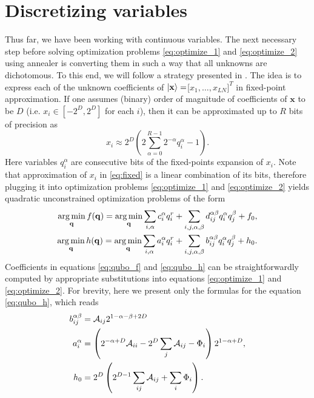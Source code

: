 \section{Discretizing variables}
Thus far, we have been working with continuous variables. The next necessary
step before solving optimization problems \eqref{eq:optimize_1} and
\eqref{eq:optimize_2} using annealer is converting them in such a way that all
unknowns are dichotomous. To this end, we will follow a strategy presented in
\cite{fixedpoint,chang}. The idea is to express each of the unknown
coefficients of $\ket{\mathbf{x}} = $[$x_1, \ldots, x_{LN}]^T$ in fixed-point
approximation. If one assumes (binary) order of magnitude of coefficients of
$\mathbf x$ to be $D$ (i.e. $x_i \in [-2^D, 2^D]$ for each $i$), then it can be
approximated up to $R$ bits of precision as
\begin{equation}
  \label{eq:fixed}
  x_i \approx 2^D \left(2 \sum_{\alpha=0}^{R-1}2^{-\alpha}q_i^{\alpha} -1\right).
\end{equation}
Here variables $q_i^\alpha$ are consecutive bits of the fixed-points expansion
of $x_i$. Note that approximation of $x_i$ in \eqref{eq:fixed} is a linear
combination of its bits, therefore plugging it into optimization problems
\eqref{eq:optimize_1} and \eqref{eq:optimize_2} yields quadratic unconstrained
optimization problems of the form
\begin{align}
  \label{eq:qubo_f}
  \operatorname*{arg\,min}_{\mathbf{q}} f(\mathbf{q}) = \operatorname*{arg\,min}_{\mathbf{q}} \sum_{i,\alpha} c_i^{\alpha} q_i^r + \sum_{i,j,\alpha,\beta} d_{ij}^{\alpha\beta} q_i^{\alpha} q_j^{\beta} + f_0, \\
  \label{eq:qubo_h}
  \operatorname*{arg\,min}_{\mathbf{q}} h(\mathbf{q}) = \operatorname*{arg\,min}_{\mathbf{q}} \sum_{i,\alpha} a_i^{\alpha} q_i^r + \sum_{i,j,\alpha,\beta} b_{ij}^{\alpha\beta} q_i^{\alpha} q_j^{\beta} + h_0.
\end{align}
Coefficients in equations \eqref{eq:qubo_f} and \eqref{eq:qubo_h} can be
straightforwardly computed by appropriate substitutions into equations
\eqref{eq:optimize_1} and \eqref{eq:optimize_2}. For brevity, here we present
only the formulas for the equation \eqref{eq:qubo_h}, which reads
\begin{eqnarray}
  \begin{split}
    b_{ij}^{\alpha\beta} &= \mathcal{A}_{ij} 2^{1-\alpha-\beta+2D} \\
    a_i^\alpha &= \left( 2^{-\alpha+D}\mathcal{A}_{ii} - 2^D\sum_{j}\mathcal{A}_{ij}- \Phi_i\right)2^{1-\alpha+D},
    \\
    h_0 &= 2^D\left( 2^{D-1}\sum_{ij}\mathcal{A}_{ij}+\sum_i \Phi_i\right).
  \end{split}
  \label{eq:coeff}
\end{eqnarray}

